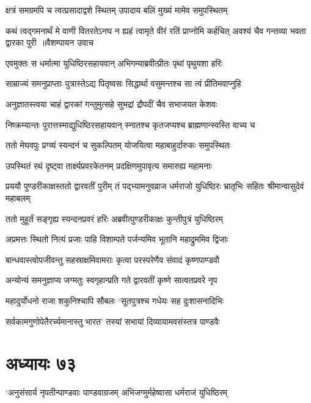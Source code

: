 \twolineshloka
{क्षत्रं समग्रमपि च त्वत्प्रसादाद्वशे स्थितम्}
{उपादाय बलिं मुख्यं मामेव समुपस्थितम्}


कथं त्वद्गमनार्थं मे वाणी वितरतेऽनघ
\twolineshloka
{न ह्यहं त्वामृते वीरं रतिं प्राप्नोमि कर्हचित्}
{अवश्यं चैव गन्तव्या भवता द्वारका पुरी ॥वैशम्पायन उवाच}


\twolineshloka
{एवमुक्तः स धर्मात्मा युधिष्ठिरसहायवान्}
{अभिगम्याब्रवीत्प्रीतः पृथां पृथुयशा हरिः}


\twolineshloka
{साम्राज्यं समनुप्राप्ताः पुत्रास्तेऽद्य पितृष्वसः}
{सिद्धार्था वसुमन्तश्च सा त्वं प्रीतिमवाप्नुहि}


\twolineshloka
{अनुज्ञातस्त्वया चाहं द्वारकां गन्तुमुत्सहे}
{सुभद्रां द्रौपदीं चैव सभाजयत केशवः}


\twolineshloka
{निष्क्रम्यान्तः पुरात्तस्माद्युधिष्ठिरसहायवान्}
{स्नातश्च कृतजप्यश्च ब्राह्मणान्स्वस्ति वाच्य च}


\twolineshloka
{ततो मेघवपुः प्रग्व्यं स्यन्दनं च सुकल्पितम्}
{योजयित्वा महाबाहुर्दारुकः समुपस्थितः}


\twolineshloka
{उपस्थितं रथं दृष्ट्वा तार्क्ष्यप्रवरकेतनम्}
{प्रदक्षिणमुपावृत्य समारुह्य महामनाः}


प्रययौ पुण्डरीकाक्षस्ततो द्वारवतीं पुरीम्
\twolineshloka
{तं पद्भ्यामनुवव्राज धर्मराजो युधिष्ठिरः}
{भ्रातृभिः सहितः श्रीमान्वासुदेवं महाबलम्}


\twolineshloka
{ततो मुहूर्तं सङ्गृह्य स्यन्दनप्रवरं हरिः}
{अब्रवीत्पुण्डरीकाक्षः कुन्तीपुत्रं युधिष्ठिरम्}


\twolineshloka
{अप्रमत्तः स्थितो नित्यं प्रजाः पाहि विशाम्पते}
{पर्जन्यमिव भूतानि महाद्रुममिव द्विजाः}


\twolineshloka
{बान्धवास्त्वोपजीवन्तु सहस्राक्षमिवामराः}
{कृत्वा परस्परेणैव संवादं कृष्णपाण्डवौ}


\twolineshloka
{अन्योन्यं समनुज्ञाप्य जग्मतुः स्वगृहान्प्रति}
{गते द्वारवतीं कृष्णे सात्वतप्रवरे नृप}


\twolineshloka
{महादुर्योधनो राजा शकुनिश्चापि सौबलः}
{`सूतपुत्रश्च गधेयः सह दुःशासनादिभिः}


\twolineshloka
{सर्वकामगुणोपेतैरर्च्यमानास्तु भारत'}
{तस्यां सभायां दिव्यायामवसंस्तत्र पाण्डवैः}


\chapter{अध्यायः ७३}
\twolineshloka
{`अनुसंसार्य नृपतीन्पाण्डवाः पाण्डवाग्रजम्}
{अभिजग्मुर्महेष्वासा धर्मराजं युधिष्ठिरम्}


